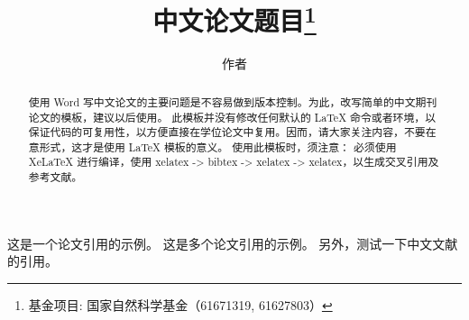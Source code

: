 \documentclass[lang=cn,11pt,a4paper,cite=number, win10]{etpaper}
\title{中文论文题目\footnote{基金项目: 国家自然科学基金（61671319, 61627803）}}
\author{作者}
\institute{（天津大学电气自动化与信息工程学院，天津市过程检测与控制重点实验室，天津~300072）}
\date{\zhtoday}
\begin{document}
\maketitle

\begin{abstract}
使用 Word 写中文论文的主要问题是不容易做到版本控制。为此，改写简单的中文期刊论文的模板，建议以后使用。
此模板并没有修改任何默认的 \LaTeX{} 命令或者环境，以保证代码的可复用性，以方便直接在学位论文中复用。因而，请大家关注内容，不要在意形式，这才是使用 \LaTeX{} 模板的意义。
使用此模板时，须注意：
必须使用 {XeLaTeX} 进行编译，使用 xelatex -> bibtex -> xelatex -> xelatex，以生成交叉引用及参考文献。
\end{abstract}
















这是一个论文引用的示例\cite{Cui2011}。
这是多个论文引用的示例\cite{Yang2002,Beck1997,WANG1999}。
另外，测试一下中文文献的引用\cite{Li2006,Zhang2018}。


\end{document}
